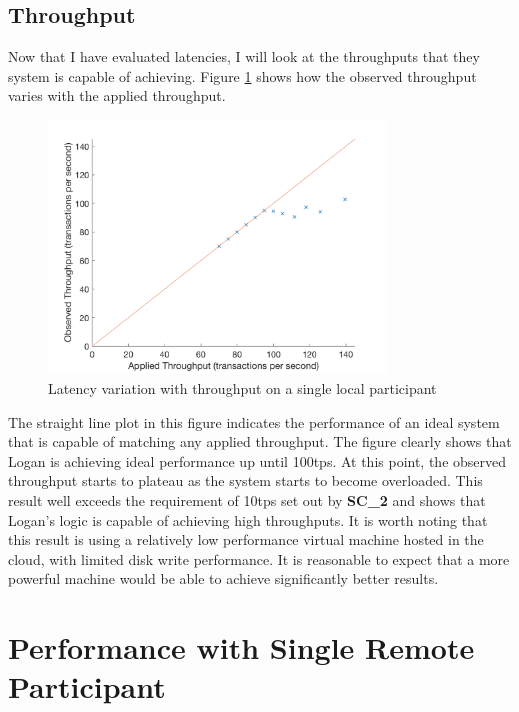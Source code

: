 \documentclass[12pt,a4paper,twoside,openright]{report}
\begin{document}
	\subsection{Throughput}
	Now that I have evaluated latencies, I will look at the throughputs that they system is capable of achieving.
	Figure \ref{fig:singlocal} shows how the observed throughput varies with the applied throughput.  
	\begin{figure}
		\centering
		\includegraphics[width=0.8\textwidth]{figs/appliedvsobservedlocal.png} 
		\caption{Latency variation with throughput on a single local participant}
		\label{fig:singlocal}
	\end{figure}
	The straight line plot in this figure indicates the performance of an ideal system that is capable of matching any applied throughput.
	The figure clearly shows that Logan is achieving ideal performance up until 100tps.
	At this point, the observed throughput starts to plateau as the system starts to become overloaded. 
	This result well exceeds the requirement of 10tps set out by \textbf{SC\_2} and shows that Logan's logic is capable of achieving high throughputs.
	It is worth noting that this result is using a relatively low performance virtual machine hosted in the cloud, with limited disk write performance. 
	It is reasonable to expect that a more powerful machine would be able to achieve significantly better results.\\

	\section{Performance with Single Remote Participant}
\end{document}
